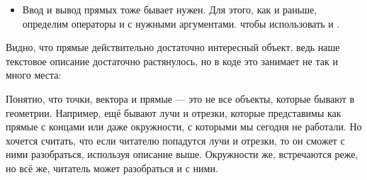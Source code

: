 \begin{itemize}
    Хочется разделять эти два случая, поэтому проверим различаются ли все коэффициенты в одинаковое количество раз (если да, то это уравнения одной прямой). Понятно, что это означает необходимость проверить три равенства:
    \[\begin{multisys}
        \begin{system}
            \frac{a_1}{a_2} = \frac{b_1}{b_2} \\
            \frac{b_1}{b_2} = \frac{c_1}{c_2} \\
            \frac{c_1}{c_2} = \frac{a_1}{a_2}
        \end{system}
        \iff
        \begin{system}
            a_1 b_2 = a_2 b_1 \\
            b_1 c_2 = b_2 c_1 \\
            a_2 c_1 = a_1 c_2
        \end{system}
        \iff
        \begin{system}
            a_1 b_2 - a_2 b_1 = 0 \\
            b_1 c_2 - b_2 c_1 = 0 \\
            a_2 c_1 - a_1 c_2 = 0
        \end{system}
    \end{multisys}\]
    Интересно, что первое из этих равенств мы уже проверили, а второе и третье выражения используются в формулах для координаты точки пересечения прямых.
    
    Таким образом, мы умеем разделять случаи взаимного расположения прямых и определять точку их пересечения, а в коде для пересечения удобно использовать оператор \lcpp{^}.
    
    \item Ввод и вывод прямых тоже бывает нужен. Для этого, как и раньше, определим операторы \lcpp{>>} и \lcpp{<<} с нужными аргументами. чтобы использовать  и .
\end{itemize}

Видно, что прямые действительно достаточно интересный объект, ведь наше текстовое описание достаточно растянулось, но в коде это занимает не так и много места:



Понятно, что точки, вектора и прямые — это не все объекты, которые бывают в геометрии. Например, ещё бывают лучи и отрезки, которые представимы как прямые с концами или даже окружности, с которыми мы сегодня не работали. Но хочется считать, что если читателю попадутся лучи и отрезки, то он сможет с ними разобраться, используя описание выше. Окружности же, встречаются реже, но всё же, читатель может разобраться и с ними.

